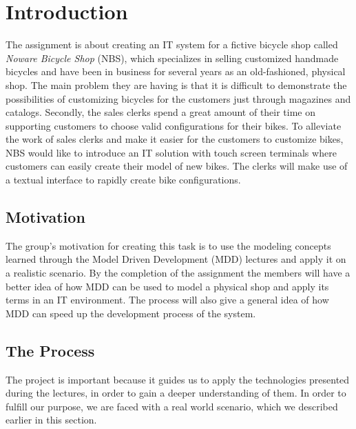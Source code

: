 \section{Introduction}
\label{sec.introduction}
\noindent The assignment is about creating an IT system for a fictive bicycle
shop called \emph{Noware Bicycle Shop} (NBS), which specializes in selling
customized handmade bicycles and have been in business for several years as an
old-fashioned, physical shop. The main problem they are having is that it is
difficult to demonstrate the possibilities of customizing bicycles for the
customers just through magazines and catalogs. Secondly, the sales clerks spend
a great amount of their time on supporting customers to choose valid
configurations for their bikes. To alleviate the work of sales clerks and make
it easier for the customers to customize bikes, NBS would like to introduce an
IT solution with touch screen terminals where customers can easily create their
model of new bikes. The clerks will make use of a textual interface to rapidly
create bike configurations.

\subsection{Motivation}
\noindent The group's motivation for creating this task is to use the modeling
concepts learned through the Model Driven Development (MDD) lectures and apply
it on a realistic scenario. By the completion of the assignment the members will
have a better idea of how MDD can be used to model a physical shop and apply its
terms in an IT environment.  The process will also give a general idea of how
MDD can speed up the development process of the system.

\subsection{The Process}
\noindent The project is important because it guides us to apply the
technologies presented during the lectures, in order to gain a deeper
understanding of them. In order to fulfill our purpose, we are faced with a real
world scenario,
which we described earlier in this section.\\

